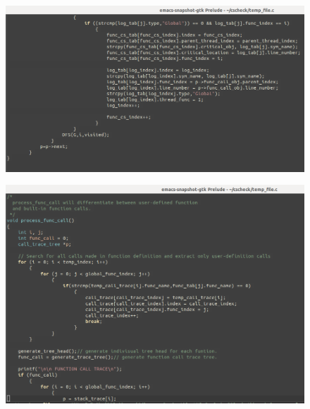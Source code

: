 \begin{figure}[H]
\centering
\includegraphics[scale=0.4]{Snaps/util_9.png}
\label{<<Label>>}
\end{figure}

\begin{figure}[H]
\centering
\includegraphics[scale=0.4]{Snaps/util_10.png}
\label{<<Label>>}
\end{figure}

